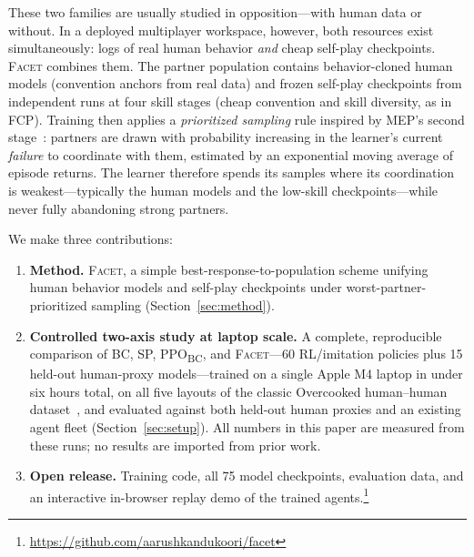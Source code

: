 \documentclass[11pt]{article}
\newcommand{\facet}{\textsc{Facet}}
\newcommand{\ppobc}{PPO\textsubscript{BC}}
\begin{document}
These two families are usually studied in opposition---with human data or
without. In a deployed multiplayer workspace, however, both resources exist
simultaneously: logs of real human behavior \emph{and} cheap self-play
checkpoints. \facet{} combines them. The partner population contains
behavior-cloned human models (convention anchors from real data) and frozen
self-play checkpoints from independent runs at four skill stages (cheap
convention and skill diversity, as in FCP). Training then applies a
\emph{prioritized sampling} rule inspired by MEP's second
stage~\citep{zhao2023maximum}: partners are drawn with probability increasing
in the learner's current \emph{failure} to coordinate with them, estimated by
an exponential moving average of episode returns. The learner therefore
spends its samples where its coordination is weakest---typically the human
models and the low-skill checkpoints---while never fully abandoning strong
partners.

We make three contributions:
\begin{enumerate}
  \item \textbf{Method.} \facet{}, a simple best-response-to-population
  scheme unifying human behavior models and self-play checkpoints under
  worst-partner-prioritized sampling (Section~\ref{sec:method}).
  \item \textbf{Controlled two-axis study at laptop scale.} A complete,
  reproducible comparison of BC, SP, \ppobc{}, and \facet{}---60 RL/imitation
  policies plus 15 held-out human-proxy models---trained on a single Apple
  M4 laptop in under six hours total, on all five layouts of the classic
  Overcooked human--human dataset~\citep{carroll2019utility}, and evaluated
  against both held-out human proxies and an existing agent fleet
  (Section~\ref{sec:setup}). All numbers in this paper are measured from
  these runs; no results are imported from prior work.
  \item \textbf{Open release.} Training code, all 75 model checkpoints,
  evaluation data, and an interactive in-browser replay demo of the trained
  agents.\footnote{\url{https://github.com/aarushkandukoori/facet}}
\end{enumerate}
\end{document}
